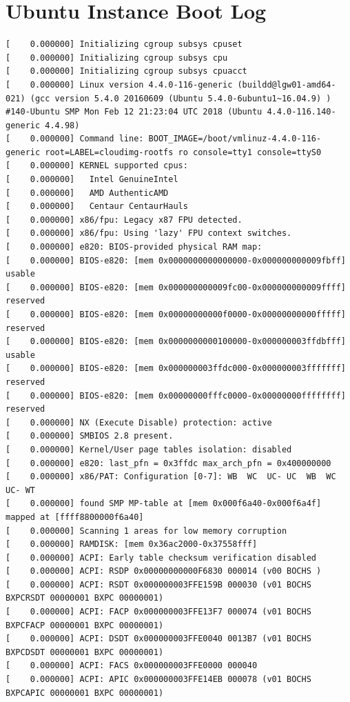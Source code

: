 \documentclass[12pt]{article}
\begin{document}
\appendix
\newpage
\clearpage
\section{Ubuntu Instance Boot Log}
\scriptsize
\begin{verbatim}
[    0.000000] Initializing cgroup subsys cpuset
[    0.000000] Initializing cgroup subsys cpu
[    0.000000] Initializing cgroup subsys cpuacct
[    0.000000] Linux version 4.4.0-116-generic (buildd@lgw01-amd64-021) (gcc version 5.4.0 20160609 (Ubuntu 5.4.0-6ubuntu1~16.04.9) ) #140-Ubuntu SMP Mon Feb 12 21:23:04 UTC 2018 (Ubuntu 4.4.0-116.140-generic 4.4.98)
[    0.000000] Command line: BOOT_IMAGE=/boot/vmlinuz-4.4.0-116-generic root=LABEL=cloudimg-rootfs ro console=tty1 console=ttyS0
[    0.000000] KERNEL supported cpus:
[    0.000000]   Intel GenuineIntel
[    0.000000]   AMD AuthenticAMD
[    0.000000]   Centaur CentaurHauls
[    0.000000] x86/fpu: Legacy x87 FPU detected.
[    0.000000] x86/fpu: Using 'lazy' FPU context switches.
[    0.000000] e820: BIOS-provided physical RAM map:
[    0.000000] BIOS-e820: [mem 0x0000000000000000-0x000000000009fbff] usable
[    0.000000] BIOS-e820: [mem 0x000000000009fc00-0x000000000009ffff] reserved
[    0.000000] BIOS-e820: [mem 0x00000000000f0000-0x00000000000fffff] reserved
[    0.000000] BIOS-e820: [mem 0x0000000000100000-0x000000003ffdbfff] usable
[    0.000000] BIOS-e820: [mem 0x000000003ffdc000-0x000000003fffffff] reserved
[    0.000000] BIOS-e820: [mem 0x00000000fffc0000-0x00000000ffffffff] reserved
[    0.000000] NX (Execute Disable) protection: active
[    0.000000] SMBIOS 2.8 present.
[    0.000000] Kernel/User page tables isolation: disabled
[    0.000000] e820: last_pfn = 0x3ffdc max_arch_pfn = 0x400000000
[    0.000000] x86/PAT: Configuration [0-7]: WB  WC  UC- UC  WB  WC  UC- WT  
[    0.000000] found SMP MP-table at [mem 0x000f6a40-0x000f6a4f] mapped at [ffff8800000f6a40]
[    0.000000] Scanning 1 areas for low memory corruption
[    0.000000] RAMDISK: [mem 0x36ac2000-0x37558fff]
[    0.000000] ACPI: Early table checksum verification disabled
[    0.000000] ACPI: RSDP 0x00000000000F6830 000014 (v00 BOCHS )
[    0.000000] ACPI: RSDT 0x000000003FFE159B 000030 (v01 BOCHS  BXPCRSDT 00000001 BXPC 00000001)
[    0.000000] ACPI: FACP 0x000000003FFE13F7 000074 (v01 BOCHS  BXPCFACP 00000001 BXPC 00000001)
[    0.000000] ACPI: DSDT 0x000000003FFE0040 0013B7 (v01 BOCHS  BXPCDSDT 00000001 BXPC 00000001)
[    0.000000] ACPI: FACS 0x000000003FFE0000 000040
[    0.000000] ACPI: APIC 0x000000003FFE14EB 000078 (v01 BOCHS  BXPCAPIC 00000001 BXPC 00000001)

\end{verbatim}
\end{document}
